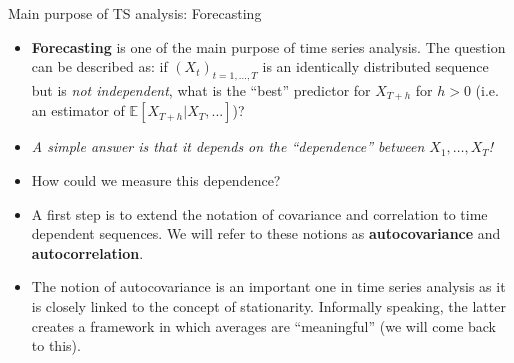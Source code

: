 \documentclass[envcountsect,usenames,dvipsnames]{beamer}
\theoremstyle{mystyle}
\begin{document}
\begin{frame}{Main purpose of TS analysis: Forecasting}
	\small
	\begin{block}{ }
		\begin{itemize}
			\item {\color{beamer@UIUCblue}\textbf{Forecasting}} is one of the main purpose of time series analysis. The question can be described as: if $(X_t)_{t = 1, ..., T}$ is an identically distributed sequence but is {\color{beamer@myorange}\emph{not independent}}, what is the ``best'' predictor for ${X}_{T+h}$ for $h > 0$ (i.e. an estimator of $\mathbb{E}[X_{T+h}| X_T,...]$)? 
			\item \emph{A simple answer is that it depends on the ``dependence'' between $X_{1},\hdots,X_{T}$!}
			\item How could we measure this dependence?
			\item A first step is to extend the notation of covariance and correlation to time dependent sequences. We will refer to these notions as {\color{beamer@UIUCblue}\textbf{autocovariance}} and {\color{beamer@UIUCblue}\textbf{autocorrelation}}.
			\item The notion of autocovariance is an important one in time series analysis as it is closely linked to the concept of stationarity. Informally speaking, the latter creates a framework in which averages are ``meaningful'' (we will come back to this).
		\end{itemize}
	\end{block}
\end{frame}
	
\end{document}

